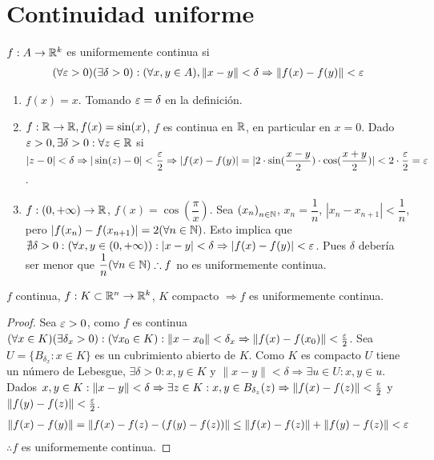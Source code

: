\section{Continuidad uniforme}

\begin{definition}
  \(f: A \to \mathbb{R}^k\) es uniformemente continua si \begin{align*}
    (\forall \varepsilon > 0)(\exists \delta > 0) : (\forall x,y \in A), \|x-y\| < \delta \Rightarrow \|f(x) - f(y)\| < \varepsilon
  \end{align*}
\end{definition}

\begin{eg}
  \begin{enumerate}
    \item \(f(x) = x\). Tomando \(\varepsilon = \delta \) en la definición.
    \item \(f: \mathbb{R} \to \mathbb{R}, f(x) = \sin(x)\), \(f\) es continua en \(\mathbb{R} \), en particular en \(x = 0\). Dado \(\varepsilon > 0, \exists \delta > 0 : \forall z \in \mathbb{R} \) si \(|z-0| < \delta \Rightarrow |\sin(z) - 0| < \dfrac{\varepsilon}{2} \Rightarrow |f(x) - f(y)| = |2 \cdot \sin(\dfrac{x-y}{2}) \cdot \cos(\dfrac{x+y}{2})| < 2 \cdot \dfrac{\varepsilon}{2} = \varepsilon \).
    \item \(f: (0, +\infty) \to \mathbb{R} \), \(f(x) = \cos(\dfrac{\pi}{x})\). Sea \({(x_n)}_{n \in \mathbb{N}} \), \(x_n = \dfrac{1}{n} \), \(|x_n - x_{n+1}| < \dfrac{1}{n} \), pero \(|f(x_n) - f(x_{n+1})| = 2 (\forall n \in \mathbb{N})\). Esto implica que \(\nexists \delta > 0 : (\forall x,y \in (0, +\infty)) : |x-y| < \delta \Rightarrow |f(x) - f(y)| < \varepsilon \). Pues \(\delta \) debería ser menor que \(\dfrac{1}{n} (\forall n \in \mathbb{N}) \therefore f\) no es uniformemente continua.
  \end{enumerate}
\end{eg}

\begin{theorem}
  \(f\) continua, \(f: K \subset \mathbb{R}^n \to \mathbb{R}^k\), \(K\) compacto \(\Rightarrow f\) es uniformemente continua.
  \begin{proof}
    Sea \(\varepsilon > 0\), como \(f\) es continua \((\forall x \in K)(\exists \delta_x > 0) : (\forall x_0 \in K) : \|x - x_0\| < \delta_x \Rightarrow \|f(x) - f(x_0)\| < \frac{\varepsilon}{2} \). Sea \(U = \{B_{\delta_x} : x \in K\} \) es un cubrimiento abierto de \(K\). Como \(K\) es compacto \(U\) tiene un número de Lebesgue, \(\exists \delta > 0 : x, y \in K\) y \( \|x-y\| < \delta \Rightarrow \exists u \in U : x, y \in u\). Dados \(x, y \in K : \|x-y\| < \delta \Rightarrow \exists z \in K : x, y \in B_{\delta_z}(z) \Rightarrow \|f(x) - f(z)\| < \frac{\varepsilon}{2} \) y \( \|f(y) - f(z)\| < \frac{\varepsilon}{2} \).
    \begin{align*}
      \|f(x) - f(y)\| = \|f(x) - f(z) - (f(y) - f(z))\| \leq \|f(x) - f(z)\| + \|f(y) - f(z)\| < \varepsilon
    \end{align*} \(\therefore f\) es uniformemente continua.
  \end{proof}
\end{theorem}

